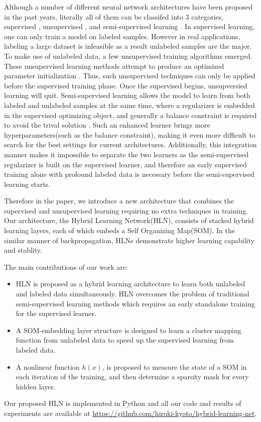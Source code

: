 \documentclass[3p,times,procedia]{elsarticle}
\begin{document}
Although a number of
different neural network architectures
have been proposed in the past years,
literally all of them can be classifed
into 3 categories, supervised
\cite{lecun1990handwritten}, 
unsupervised
\cite{vincent2010stacked}, 
and semi-supervised learning
\cite{chapelle2009semi}.
In supervised learning, 
one can only train a model on
labeled samples. However in real 
applications, labeling a large 
dataset is infeasible as a result
unlabeled samples are 
the major. To make use of 
unlabeled data, a few 
unsupervised training algorithms 
emerged. These unsupervised learning
methods attempt to produce an optimized 
parameter initialization
\cite{le2013building}.
Thus, such unsupervised techniques 
can only be applied before the 
supervised training phase. Once 
the supervised begins, 
unsupversied learning will quit.
Semi-supervised learning
allows the model to learn from
both labeled and unlabeled samples
at the same time, where a
regularizer is embedded in
the supervised optimizing object,
and generally a balance constraint is
required to avoid the trival solution
\cite{socher2011semi}.
Such an enhanced learner brings more 
hyperparameters(such as the balance 
constraint), making it even more 
difficult to search for the best 
settings for current architectures. 
Additionally, this integration manner 
makes it impossible to separate the 
two learners as the semi-supervised 
regularizer is built on the supervised 
learner, and therefore an 
early supervised training alone with 
profound labeled data is necessary
before the semi-supervised learning 
starts.

Therefore in the paper, we introduce 
a new architecture that combines the
supervised and unsupervised learning
requiring no extra techniques in
training. Our architecture, the Hybrid
Learning Network(HLN), consists of 
stacked hybrid learning layers, 
each of which
embeds a Self Organizing
Map(SOM). In the similar manner of 
backpropagation, HLNs
demonstrate higher learning
capability and stablity. 

The main contributions of our work are:
\begin{itemize}
\item
	HLN is proposed as a hybrid learning
	architecture to learn both unlabeled 
		and labeled data simultaneously.
		HLN overcomes
the problem of traditional 
semi-supervised learning methods which 
requires
an early standalone training for the
supervised learner.
\item A SOM-embedding layer structure is 
	designed to learn a cluster 
mapping function from unlabeled data
		to speed up the supervised
		learning from labeled
data.
\item A nonlinear function $h(x)$,
	is proposed to 
		measure the state of a
		SOM in each iteration of the 
		training, and then determine 
		a sparsity
		mask for every hidden layer.
\end{itemize}
Our proposed HLN is implemented in 
Python and all
our code and results of experiments
are available at
\url{https://github.com/hiroki-kyoto/hybrid-learning-net}.
\end{document}
